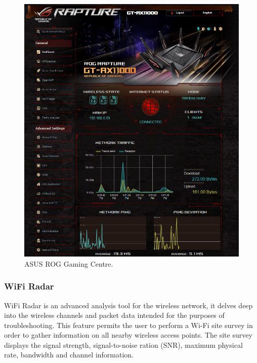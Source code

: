 \begin{figure} [ht]
    \centering
    \includegraphics[width=1\linewidth]{pages/Chapter2/Chapter 2 images/ASUSwebGUI.PNG}
    \caption{ASUS ROG Gaming Centre.}
    \label{fig_ASUSwebGUI}
\end{figure}

\subsubsection{WiFi Radar}

WiFi Radar is an advanced analysis tool for the wireless network, it delves deep into the wireless channels and packet data intended for the purposes of troubleshooting. This feature permits the user to perform a Wi-Fi site survey in order to gather information on all nearby wireless access points. The site survey displays the signal strength, signal-to-noise ration (SNR), maximum physical rate, bandwidth and channel information. 




